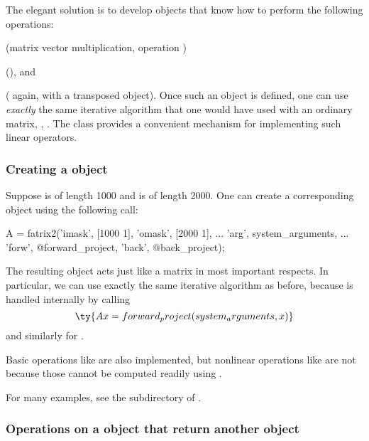 The elegant solution
is to develop \matlab objects
that know how to perform
the following operations:
\blist
\item
{}
(matrix vector multiplication,
operation )
\item
{}
(), and
\item
{}
( again,
with a transposed object).
\elist
Once such an object is
defined,
one can use \emph{exactly}
the same iterative algorithm
that one would have used
with an ordinary matrix,
\eg,
.
%
The \fatrixx class
provides a convenient mechanism
for implementing
such linear operators.

\subsubsection{Creating a \fatrixx object}

Suppose \x is of length 1000
and \y is of length 2000.
One can create a corresponding \fatrixx object
using the following call:
\begin{verbatimtab}
A = fatrix2('imask', [1000 1], 'omask', [2000 1], ...
	'arg', system_arguments, ...
	'forw', @forward_project, 'back', @back_project);
\end{verbatimtab}
The resulting \fatrixx object 
acts just like a matrix
in most important respects.
In particular,
we can use exactly the same iterative algorithm
 as before,
because
is handled internally
by calling
\[
\ty{
Ax = forward_project(system_arguments, x)
}
\]
and similarly for
.

Basic operations
like 
are also implemented,
but nonlinear operations
like 
are not
because those cannot be computed readily
using . 

For many examples, see
the  subdirectory of \irt.

\subsubsection
{
Operations on a \fatrixx object
that return another \fatrixx object
}

